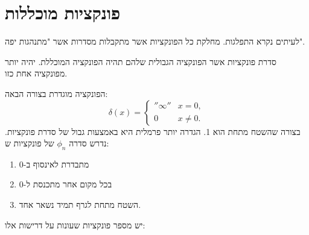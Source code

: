 \documentclass{tstextbook}
\begin{document}
\section{פונקציות מוכללות}

\begin{definition}
לעיתים נקרא התפלגות. מחלקת כל הפונקציות אשר מתקבלות מסדרות אשר "מתנהגות יפה".

\end{definition}
\begin{definition}
סדרת פונקציות אשר הפונקציה הגבולית שלהם תהיה הפונקציה המוכללת. יהיה יותר מפונקציה אחת כזו.

\end{definition}
\begin{definition}
הפונקציה מוגדרת בצורה הבאה:
$$ \delta(x)=\left\{\begin{matrix}''\infty''&x=0,\\0&x\ne0.\end{matrix}\right.$$
בצורה שהשטח מתחת הוא 1.
הגדרה יותר פרמלית היא באמצעות גבול של סדרת פונקציות. נדרש סדרה \(\phi_{n}\) של פונקציות ש:

  \begin{enumerate}
    \item מתבדרת לאינסוף ב-0 


    \item בכל מקום אחר מתכנסת ל-0  


    \item השטח מתחת לגרף תמיד נשאר אחד. 


  \end{enumerate}
\end{definition}
יש מספר פונקציות שעונות על דרישות אלו:
\end{document}

